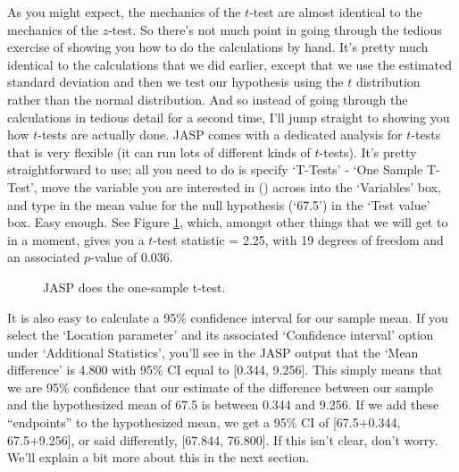 
As you might expect, the mechanics of the $t$-test are almost identical to the mechanics of the $z$-test. So there's not much point in going through the tedious exercise of showing you how to do the calculations by hand. It's pretty much identical to the calculations that we did earlier, except that we use the estimated standard deviation and then we test our hypothesis using the $t$ distribution rather than the normal distribution. And so instead of going through the calculations in tedious detail for a second time, I'll jump straight to showing you how $t$-tests are actually done. JASP comes with a dedicated analysis for $t$-tests that is very flexible (it can run lots of different kinds of $t$-tests). It's pretty straightforward to use; all you need to do is specify `T-Tests' - `One Sample T-Test', move the variable you are interested in () across into the `Variables' box, and type in the mean value for the null hypothesis (`67.5') in the `Test value' box. Easy enough. See Figure \ref{fig:ttest_one}, which, amongst other things that we will get to in a moment, gives you a $t$-test statistic = 2.25, with 19 degrees of freedom and an associated $p$-value of 0.036. 

\vspace{0.5cm}
\begin{figure}[ht]
\begin{center}
\caption{JASP does the one-sample t-test.}
\HR
\label{fig:ttest_one}
\end{center}
\end{figure}

It is also easy to calculate a 95\% confidence interval for our sample mean. If you select the `Location parameter' and its associated `Confidence interval' option under `Additional Statistics', you'll see in the JASP output that the `Mean difference' is 4.800 with 95\% CI equal to [0.344, 9.256].  This simply means that we are 95\% confidence that our estimate of the difference between our sample and the hypothesized mean of 67.5 is between 0.344 and 9.256.  If we add these ``endpoints'' to the hypothesized mean, we get a 95\% CI of [67.5+0.344, 67.5+9.256], or said differently, [67.844, 76.800].  If this isn't clear, don't worry.  We'll explain a bit more about this in the next section.

